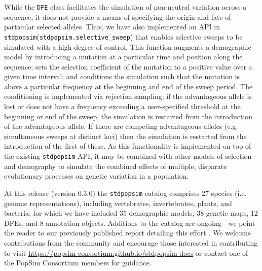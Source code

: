 \documentclass[hidelinks]{article}
\newcommand{\stdpopsim}{\texttt{stdpopsim}\xspace}
\begin{document}
    While the \texttt{DFE} class facilitates the simulation of non-neutral
    variation across a sequence, it does not provide a means of specifying the
    origin and fate of particular selected alleles.  Thus, we have also
    implemented an API in \stdpopsim (\texttt{stdpopsim.selective\_sweep}) that
    enables selective sweeps to be simulated with a high degree of control.
    This function augments a demographic model by introducing a mutation at a
    particular time and position along the sequence; sets the selection
    coefficient of the mutation to a positive value over a given time interval;
    and conditions the simulation such that the mutation is above a particular
    frequency at the beginning and end of the sweep period.  The conditioning 
    is implemented via rejection sampling; if the advantageous allele is lost
    or does not have a frequency exceeding a user-specified threshold at the
    beginning or end of the sweep, the simulation is restarted from the
    introduction of the advantageous allele.  If there are competing
    advantageous alleles (e.g.  simultaneous sweeps at distinct loci) then the
    simulation is restarted from the introduction of the first of these.  As
    this functionality is implemented on top of the existing \stdpopsim API, it
    may be combined with other models of selection and demography to simulate
    the combined effects of multiple, disparate evolutionary processes on
    genetic variation in a population.

    At this release (version 0.3.0) the \stdpopsim catalog comprises 27 species (i.e. genome representations),
    including vertebrates, invertebrates, plants, and bacteria,
    for which we have included 35 demographic models, 38 genetic maps, 12 DFEs, and 8 annotation objects. %
    Additions to the catalog are ongoing---we point the reader to our previously published
    report detailing this effort \citep{lauterbur2023expanding}. We welcome contributions from the
    community and encourage those interested in contributing to visit \url{https://popsim-consortium.github.io/stdpopsim-docs}
    or contact one of the PopSim Consortium members for guidance.
\end{document}
